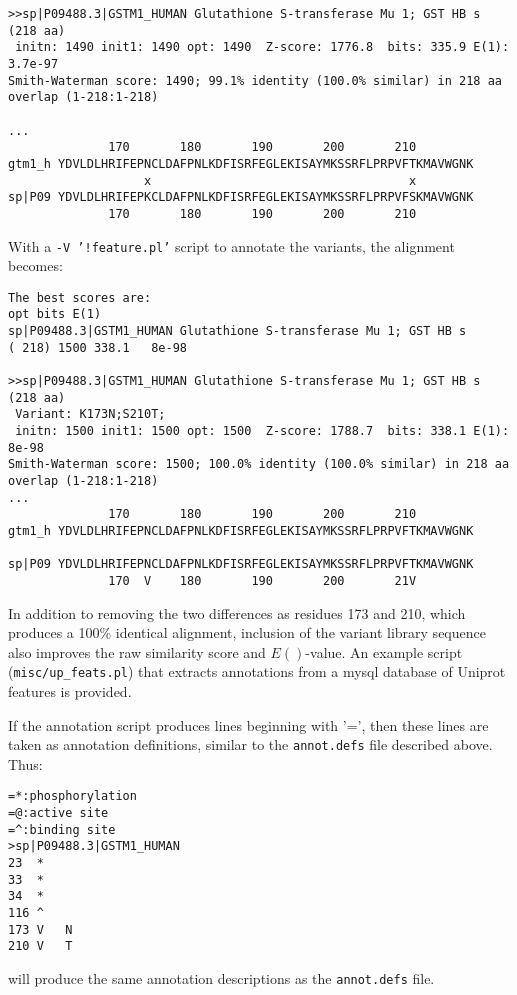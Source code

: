 \documentclass[11pt]{article}
\begin{document}
\begin{description}
\begin{footnotesize}
\begin{verbatim}
>>sp|P09488.3|GSTM1_HUMAN Glutathione S-transferase Mu 1; GST HB s            (218 aa)
 initn: 1490 init1: 1490 opt: 1490  Z-score: 1776.8  bits: 335.9 E(1): 3.7e-97
Smith-Waterman score: 1490; 99.1% identity (100.0% similar) in 218 aa overlap (1-218:1-218)

...
              170       180       190       200       210        
gtm1_h YDVLDLHRIFEPNCLDAFPNLKDFISRFEGLEKISAYMKSSRFLPRPVFTKMAVWGNK
                   x                                    x        
sp|P09 YDVLDLHRIFEPKCLDAFPNLKDFISRFEGLEKISAYMKSSRFLPRPVFSKMAVWGNK
              170       180       190       200       210        
\end{verbatim}
\end{footnotesize}

With a \texttt{-V '!feature.pl'} script to annotate the variants,
the alignment becomes:
\begin{footnotesize}
\begin{verbatim}
The best scores are:                                                          opt bits E(1)
sp|P09488.3|GSTM1_HUMAN Glutathione S-transferase Mu 1; GST HB s       ( 218) 1500 338.1   8e-98

>>sp|P09488.3|GSTM1_HUMAN Glutathione S-transferase Mu 1; GST HB s            (218 aa)
 Variant: K173N;S210T;
 initn: 1500 init1: 1500 opt: 1500  Z-score: 1788.7  bits: 338.1 E(1): 8e-98
Smith-Waterman score: 1500; 100.0% identity (100.0% similar) in 218 aa overlap (1-218:1-218)
...
              170       180       190       200       210        
gtm1_h YDVLDLHRIFEPNCLDAFPNLKDFISRFEGLEKISAYMKSSRFLPRPVFTKMAVWGNK
                                                                 
sp|P09 YDVLDLHRIFEPNCLDAFPNLKDFISRFEGLEKISAYMKSSRFLPRPVFTKMAVWGNK
              170  V    180       190       200       21V        
\end{verbatim}
\end{footnotesize}
In addition to removing the two differences as residues 173 and 210,
which produces a 100\% identical alignment, inclusion of the variant
library sequence also improves the raw similarity score and $E()$-value.
An example script (\texttt{misc/up\_feats.pl}) that extracts
annotations from a mysql database of Uniprot features is provided.

If the annotation script produces lines beginning with '=', then these
lines are taken as annotation definitions, similar to the
\texttt{annot.defs} file described above.  Thus:
\begin{footnotesize}
\begin{verbatim}
=*:phosphorylation
=@:active site
=^:binding site
>sp|P09488.3|GSTM1_HUMAN
23	*	
33	*	
34	*	
116	^	
173	V	N
210	V	T
\end{verbatim}
\end{footnotesize}
will produce the same annotation descriptions as the
\texttt{annot.defs} file.


\end{description}
\end{document}
